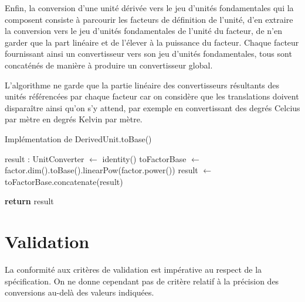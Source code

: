 \documentclass[a4paper,draft,twoside,10pt]{article}
\begin{document}
Enfin, la conversion d'une unité dérivée vers le jeu d'unités fondamentales qui la composent consiste à parcourir les
facteurs de définition de l'unité, d'en extraire la conversion vers le jeu d'unités fondamentales de l'unité du facteur,
de n'en garder que la part linéaire et de l'élever à la puissance du facteur. Chaque facteur fournissant ainsi un
convertisseur vers son jeu d'unités fondamentales, tous sont concaténés de manière à produire un convertisseur global.

L'algorithme ne garde que la partie linéaire des convertisseurs résultants des unités référencées par chaque facteur car
on considère que les translations doivent disparaître ainsi qu'on s'y attend, par exemple en convertissant des degrés
Celcius par mètre en degrés Kelvin par mètre.

\begin{algorithm}[!h]
\caption{Implémentation de DerivedUnit.toBase()}\label{alg:derivedUnit:toBase}
\begin{algorithmic}

\State result : UnitConverter $\gets$ identity()
\State toFactorBase $\gets$ factor.dim().toBase().linearPow(factor.power())
\State result $\gets$ toFactorBase.concatenate(result)
\EndFor

\State \textbf{return} result
\EndProcedure
\end{algorithmic}
\end{algorithm}

\section{Validation}

La conformité aux critères de validation est impérative au respect de la spécification. On ne donne cependant pas de
critère relatif à la précision des conversions au-delà des valeurs indiquées.
\end{document}
